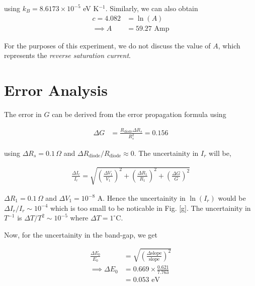 \noindent using $k_B = 8.6173 \times 10^{-5}$ eV K$^{-1}$.
Similarly, we can also obtain
\begin{align*}
    c = 4.082 &= \ln(A)\\
    \implies A &= 59.27 \text{ Amp}
\end{align*}

For the purposes of this experiment, we do not discuss the value of $A$, which represents the \textit{reverse saturation current}.
\vspace{-1em}
\section{Error Analysis}

The error in $G$ can be derived from the error propagation formula using

\begin{align*}
    \Delta G &= \frac{R_\text{diode}\Delta R_s}{R_s^2} = 0.156 \nonumber
\end{align*}

\noindent using $\Delta R_s = 0.1\,\Omega$ and $\Delta R_\text{diode}/R_\text{diode} \approx 0$. The uncertainity in $I_r$ will be,

\begin{align}
    \frac{\Delta I_r}{I_r} = \sqrt{\left(\frac{\Delta V_1}{V_1}\right)^2 + \left(\frac{\Delta R_1}{R_1}\right)^2 + \left(\frac{\Delta G}{G}\right)^2}
\end{align}

\noindent $\Delta R_1 = 0.1\,\Omega$ and $\Delta V_1 = 10^{-8}$ A. Hence the uncertainity in $\ln(I_r)$ would be $\Delta I_r/I_r \sim 10^{-4}$ which is too small to be noticable in Fig. \ref{g}. The uncertainity in $T^{-1}$ is $\Delta T/T^2 \sim 10^{-5}$ where $\Delta T = 1^\circ$C.

Now, for the uncertainity in the band-gap, we get

\begin{align}
    \frac{\Delta E_0}{E_0} &= \sqrt{\left(\frac{\Delta \text{slope}}{\text{slope}}\right)^2}\\
    \implies \Delta E_0 &= 0.669 \times \frac{0.621}{7.763}\nonumber\\
    &= 0.053 \text{ eV}\nonumber
\end{align}